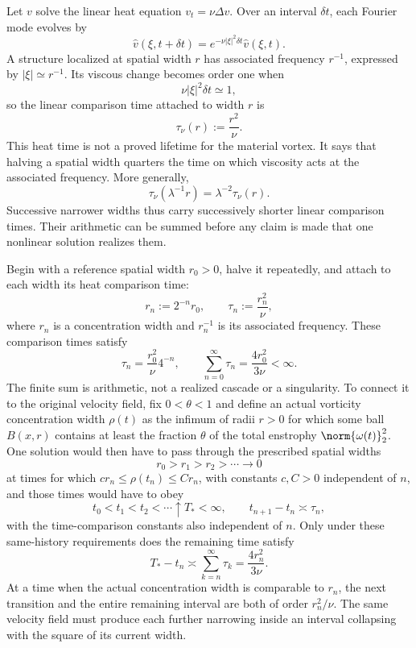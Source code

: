 
Let \(v\) solve the linear heat equation \(v_t=\nu\Delta v\). Over an interval \(\delta t\), each Fourier mode evolves by
\[
  \widehat v(\xi,t+\delta t)
  =
  e^{-\nu|\xi|^2\delta t}\widehat v(\xi,t).
\]
A structure localized at spatial width \(r\) has associated frequency \(r^{-1}\), expressed by \(|\xi|\simeq r^{-1}\). Its viscous change becomes order one when
\[
  \nu|\xi|^2\delta t\simeq1,
\]
so the linear comparison time attached to width \(r\) is
\[
  \tau_\nu(r)
  :=
  \frac{r^2}{\nu}.
\]
This heat time is not a proved lifetime for the material vortex. It says that halving a spatial width quarters the time on which viscosity acts at the associated frequency. More generally,
\[
  \tau_\nu(\lambda^{-1}r)
  =
  \lambda^{-2}\tau_\nu(r).
\]
Successive narrower widths thus carry successively shorter linear comparison times. Their arithmetic can be summed before any claim is made that one nonlinear solution realizes them.


Begin with a reference spatial width \(r_0>0\), halve it repeatedly, and attach to each width its heat comparison time:
\[
  r_n:=2^{-n}r_0,
  \qquad
  \tau_n:=\frac{r_n^2}{\nu},
\]
where \(r_n\) is a concentration width and \(r_n^{-1}\) is its associated frequency. These comparison times satisfy
\[
  \tau_n
  =
  \frac{r_0^2}{\nu}4^{-n},
  \qquad
  \sum_{n=0}^{\infty}\tau_n
  =
  \frac{4r_0^2}{3\nu}
  <
  \infty.
\]
The finite sum is arithmetic, not a realized cascade or a singularity. To connect it to the original velocity field, fix \(0<\theta<1\) and define an actual vorticity concentration width \(\rho(t)\) as the infimum of radii \(r>0\) for which some ball \(B(x,r)\) contains at least the fraction \(\theta\) of the total enstrophy \(\norm{\omega(t)}_2^2\). One \NavierStokes{} solution would then have to pass through the prescribed spatial widths
\[
  r_0>r_1>r_2>\cdots\longrightarrow0
\]
at times for which \(c r_n\leq\rho(t_n)\leq C r_n\), with constants \(c,C>0\) independent of \(n\), and those times would have to obey
\[
  t_0<t_1<t_2<\cdots\uparrow T_*<\infty,
  \qquad
  t_{n+1}-t_n\asymp\tau_n,
\]
with the time-comparison constants also independent of \(n\). Only under these same-history requirements does the remaining time satisfy
\[
  T_*-t_n
  \asymp
  \sum_{k=n}^{\infty}\tau_k
  =
  \frac{4r_n^2}{3\nu}.
\]
At a time when the actual concentration width is comparable to \(r_n\), the next transition and the entire remaining interval are both of order \(r_n^2/\nu\). The same velocity field must produce each further narrowing inside an interval collapsing with the square of its current width.